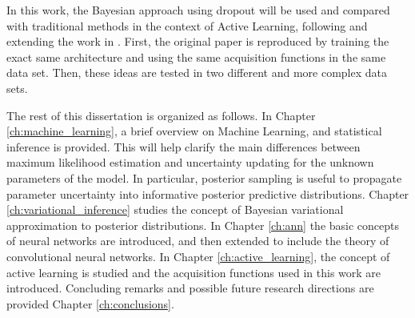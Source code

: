 In this work, the Bayesian approach using dropout will be used and compared with traditional methods in the context of Active Learning, following and extending the work in \cite{Gal2016Active}. First, the original paper is reproduced by training the exact same architecture and using the same acquisition functions in the same data set. Then, these ideas are tested in two different and more complex data sets.

The rest of this dissertation is organized as follows. In Chapter \ref{ch:machine_learning}, a brief overview on Machine Learning, and statistical inference is provided. This will help clarify the main differences between maximum likelihood estimation and uncertainty updating for the unknown parameters of the model. In particular, posterior sampling is useful to propagate parameter uncertainty into informative posterior predictive distributions. Chapter \ref{ch:variational_inference} studies the concept of Bayesian variational approximation to posterior distributions. In Chapter \ref{ch:ann} the basic concepts of neural networks are introduced, and then extended to include the theory of convolutional neural networks. In Chapter \ref{ch:active_learning}, the concept of active learning is studied and the acquisition functions used in this work are introduced. Concluding remarks and possible future research directions are provided Chapter \ref{ch:conclusions}.
